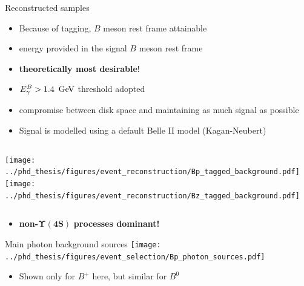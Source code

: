 \documentclass[xcolor=dvipsnames]{beamer}
\begin{document}
\begin{frame}{Reconstructed samples}
   \scriptsize
   \begin{itemize}
      \item Because of tagging, $B$ meson rest frame attainable
      \item[\ra] energy provided in the signal $B$ meson rest frame
      \item[\ra] \textbf{theoretically most desirable}!
      \item ${E^B_{\gamma}}>1.4~\mathrm{\,Ge\kern -0.1em V}$ threshold adopted
      \item[\ra] compromise between disk space and maintaining as much signal as possible
      \item Signal is modelled using a default Belle II model (Kagan-Neubert)

   \end{itemize}
   \begin{columns}
      \texttt{[image: ../phd\_thesis/figures/event\_reconstruction/Bp\_tagged\_background.pdf]}
      \texttt{[image: ../phd\_thesis/figures/event\_reconstruction/Bz\_tagged\_background.pdf]}
   \end{columns}
   \begin{itemize}
      \item[\ra] \textbf{non-}$\bm{\Upsilon(4S)}$ \textbf{processes dominant!}
   \end{itemize}
\end{frame}

\begin{frame}{Main photon background sources}
\centering\scriptsize
      \texttt{[image: ../phd\_thesis/figures/event\_selection/Bp\_photon\_sources.pdf]}

      \begin{itemize}
         \item[\ra] Shown only for $B^+$ here, but similar for $B^0$
      \end{itemize}


\end{frame}
\end{document}
